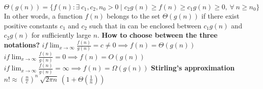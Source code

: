 \documentclass[12pt]{article}
\begin{document}
$\Theta(g(n)) = \{f(n) : \exists \ c_1, c_2, n_0 > 0 \mid c_2 g(n) \geq f(n) \geq c_1 g(n) \geq 0, \ \forall \ n \geq n_0\}$ \newline \newline
In other words, a function $f(n)$ belongs to the set $\Theta(g(n))$ if there exist positive constants $c_1$ and $c_2$
such that in can be enclosed between $c_1 g(n)$ and $c_2 g(n)$ for sufficiently large $n$. \newpage
\hspace*{-8mm} \textbf{How to choose between the three notations?} \newline \newline
$if \displaystyle{\lim_{x \to \infty}} \frac{f(n)}{g(n)} = c \neq 0 \implies f(n) = \Theta(g(n))$ \newline
$if \displaystyle{\lim_{x \to \infty}} \frac{f(n)}{g(n)} = 0 \implies f(n) = O(g(n))$ \newline
$if \displaystyle{\lim_{x \to \infty}} \frac{f(n)}{g(n)} = \infty \implies f(n) = \Omega(g(n))$ \newline \newline \newline
\textbf{Stirling's approximation} \newline \newline
$n! \approx (\frac{n}{e})^n \ \sqrt{2 \pi n} \ (1 + \Theta(\frac{1}{n}))$
\end{document}
